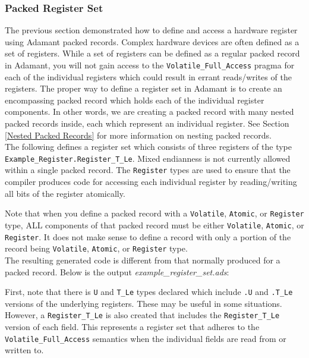 \subsubsection{Packed Register Set}

The previous section demonstrated how to define and access a hardware register using Adamant packed records. Complex hardware devices are often defined as a set of registers. While a set of registers can be defined as a regular packed record in Adamant, you will not gain access to the \texttt{Volatile\_Full\_Access} pragma for each of the individual registers which could result in errant reads/writes of the registers. The proper way to define a register set in Adamant is to create an encompassing packed record which holds each of the individual register components. In other words, we are creating a packed record with many nested packed records inside, each which represent an individual register. See Section \ref{Nested Packed Records} for more information on nesting packed records. \\

The following defines a register set which consists of three registers of the type \texttt{Example\_Register.Register\_T\_Le}. Mixed endianness is not currently allowed within a single packed record. The \texttt{Register} types are used to ensure that the compiler produces code for accessing each individual register by reading/writing all bits of the register atomically.


Note that when you define a packed record with a \texttt{Volatile}, \texttt{Atomic}, or \texttt{Register} type, ALL components of that packed record must be either \texttt{Volatile}, \texttt{Atomic}, or \texttt{Register}. It does not make sense to define a record with only a portion of the record being \texttt{Volatile}, \texttt{Atomic}, or \texttt{Register} type. \\

The resulting generated code is different from that normally produced for a packed record. Below is the output \textit{example\_register\_set.ads}:


First, note that there is \texttt{U} and \texttt{T\_Le} types declared which include \texttt{.U} and \texttt{.T\_Le} versions of the underlying registers. These may be useful in some situations. However, a \texttt{Register\_T\_Le} is also created that includes the \texttt{Register\_T\_Le} version of each field. This represents a register set that adheres to the \texttt{Volatile\_Full\_Access} semantics when the individual fields are read from or written to. \\

